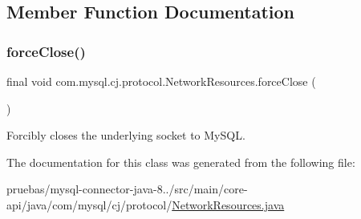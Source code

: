 \subsection{Member Function Documentation}
\mbox{\label{classcom_1_1mysql_1_1cj_1_1protocol_1_1_network_resources_a2a216e31a2398da5270533a50142eb40}} 
\subsubsection{\texorpdfstring{force\+Close()}{forceClose()}}
{\footnotesize\ttfamily final void com.\+mysql.\+cj.\+protocol.\+Network\+Resources.\+force\+Close (\begin{DoxyParamCaption}{ }\end{DoxyParamCaption})}

Forcibly closes the underlying socket to My\+S\+QL. 

The documentation for this class was generated from the following file\+:\begin{DoxyCompactItemize}
\item 
pruebas/mysql-\/connector-\/java-\/8../src/main/core-\/api/java/com/mysql/cj/protocol/\mbox{\hyperlink{_network_resources_8java}{Network\+Resources.\+java}}\end{DoxyCompactItemize}
